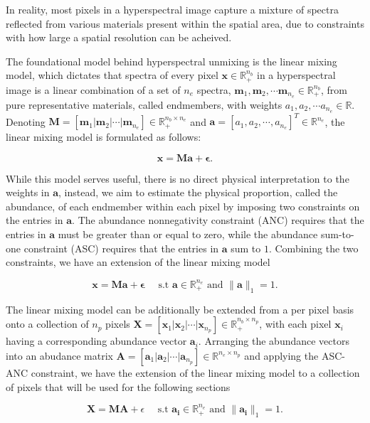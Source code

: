 In reality, most pixels in a hyperspectral image capture a mixture of spectra reflected from various materials present within the spatial area, due to constraints with how large a spatial resolution can be acheived. 





The foundational model behind hyperspectral unmixing is the linear mixing model, which dictates that spectra of every pixel $\mathbf{x} \in \mathbb{R}_+^{n_b}$ in a hyperspectral image is a linear combination of a set of $n_e$ spectra, $\mathbf{m} _1, \mathbf{m} _2, \cdots \mathbf{m} _{n_e} \in \mathbb{R}_+^{n_b}$, from pure representative materials, called endmembers, with weights $a_1, a_2, \cdots a_{n_e} \in \mathbb{R}$. Denoting $\mathbf{M} = [\mathbf{m} _1 | \mathbf{m} _2 | \cdots |\mathbf{m} _{n_e}] \in \mathbb{R}_+^{n_b \times n_e}$ and $\mathbf{a} = [a_1, a_2, \cdots ,a_{n_e}]^T \in \mathbb{R}^{n_e}$, the linear mixing model is formulated as follows:

\begin{equation}
    \label{lmm:model}
    \mathbf{x} = \mathbf{M} \mathbf{a} + \mathbf{\epsilon}.
\end{equation}

While this model serves useful, there is no direct physical interpretation to the weights in $\mathbf{a}$, instead, we aim to estimate the physical proportion, called the abundance, of each endmember within each pixel by imposing two constraints on the entries in $\mathbf{a}$. The abundance nonnegativity constraint (ANC) requires that the entries in $\mathbf{a}$ must be greater than or equal to zero, while the abundance sum-to-one constraint (ASC) requires that the entries in $\mathbf{a}$ sum to $1$. Combining the two constraints, we have an extension of the linear mixing model

\begin{equation}
    \label{lmm:abund-lmm}
    \mathbf{x} = \mathbf{M} \mathbf{a} + \mathbf{\epsilon} \quad \text{ s.t } \mathbf{a} \in \mathbb{R}_+^{n_e} \text{ and } \|\mathbf{a}\|_1 = 1.
\end{equation}

The linear mixing model can be additionally be extended from a per pixel basis onto a collection of $n_p$ pixels $\mathbf{X} = [\mathbf{x}_1 | \mathbf{x}_2 | \cdots | \mathbf{x}_{n_p}] \in \mathbb{R}_ +^{n_b \times n_p}$, with each pixel $\mathbf{x}_i$ having a corresponding abundance vector $\mathbf{a}_i$. Arranging the abundance vectors into an abudance matrix $\mathbf{A} = [\mathbf{a}_1 | \mathbf{a}_2 | \cdots | \mathbf{a}_{n_p}] \in \mathbb{R}^{n_e \times n_p}$ and applying the ASC-ANC constraint, we have the extension of the linear mixing model to a collection of pixels that will be used for the following sections

\begin{equation}
    \label{lmm:abund-lmm-collection}
    \mathbf{X} = \mathbf{M} \mathbf{A} + \epsilon \quad \text{ s.t } \mathbf{a_i} \in \mathbb{R}_+^{n_e} \text{ and } \|\mathbf{a_i}\|_1 = 1.
\end{equation}